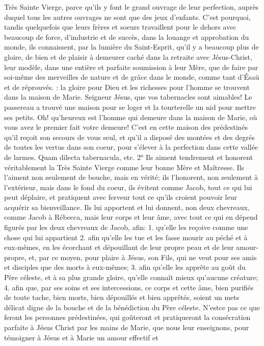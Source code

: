 Très Sainte Vierge, parce qu'ils y font le grand ouvrage de leur perfection, auprès duquel tous les autres ouvrages
ne sont que des jeux d'enfants. C'est pourquoi, tandis quelquefois que leurs frères et soeurs travaillent pour le
dehors avec beaucoup de force, d'industrie et de succès, dans la louange et approbation du monde, ils
connaissent, par la lumière du Saint-Esprit, qu'il y a beaucoup plus de gloire, de bien et de plaisir à demeurer
caché dans la retraite avec Jésus-Christ, leur modèle, dans une entière et parfaite soumission à leur Mère, que de
faire par soi-même des merveilles de nature et de grâce dans le monde, comme tant d'Ésaü et de réprouvés.
: la gloire pour Dieu et les richesses pour l'homme se trouvent dans la maison de
Marie.
Seigneur Jésus, que vos tabernacles sont aimables! Le passereau a trouvé une maison pour se loger et la
tourterelle un nid pour mettre ses petits. Oh! qu'heureux est l'homme qui demeure dans la maison de Marie, où
vous avez le premier fait votre demeure! C'est en cette maison des prédestinés qu'il reçoit son secours de vous
seul, et qu'il a disposé des montées et des degrés de toutes les vertus dans son coeur, pour s'élever à la
perfection dans cette vallée de larmes. Quam dilecta tabernacula, etc.
 2° Ils aiment tendrement et honorent véritablement la Très Sainte Vierge comme leur bonne Mère et
Maîtresse. Ils l'aiment non seulement de bouche, mais en vérité; ils l'honorent, non seulement à l'extérieur, mais
dans le fond du coeur, ils évitent comme Jacob, tout ce qui lui peut déplaire, et pratiquent avec ferveur tout ce
qu'ils croient pouvoir leur acquérir sa bienveillance. Ils lui apportent et lui donnent, non deux chevreaux, comme
Jacob à Rébecca, mais leur corps et leur âme, avec tout ce qui en dépend figurés par les deux chevreaux de
Jacob, afin: 1. qu'elle les reçoive comme une chose qui lui appartient 2. afin qu'elle les tue et les fasse mourir au
péché et à eux-mêmes, en les écorchant et dépouillant de leur propre peau et de leur amour-propre, et, par ce
moyen, pour plaire à Jésus, son Fils, qui ne veut pour ses amis et disciples que des morts à eux-mêmes; 3. afin
qu'elle les apprête au goût du Père céleste, et à sa plus grande gloire, qu'elle connaît mieux qu'aucune créature; 4.
afin que, par ses soins et ses intercessions, ce corps et cette âme, bien purifiés de toute tache, bien morts, bien
dépouillés et bien apprêtés, soient un mets délicat digne de la bouche et de la bénédiction du Père céleste. N'estce pas ce que feront les personnes prédestinées, qui goûteront et pratiqueront la consécration parfaite à Jésus Christ par les mains de Marie, que nous leur enseignons, pour témoigner à Jésus et à Marie un amour effectif et
